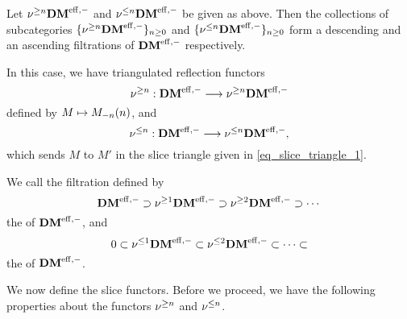 \begin{prop}\label{prop_slice_DMeff}
Let $\sgDM{n} \DMeff$ and $\slDM{n} \DMeff$ be given as above.
Then the collections of subcategories $\{\sgDM{n} \DMeff\}_{n 
\geq 0}$ and $\{\slDM{n} \DMeff\}_{n \geq 0}$ form a descending 
and an ascending filtrations of $\DMeff$ respectively.

In this case, we have triangulated reflection functors 
\[
\sgDM{n}: \DMeff \to \sgDM{n}\DMeff
\] 
defined by $M \mapsto \tZ[n]{\hZ[n]{M}}$, and 
\[
\slDM{n}: \DMeff \to \slDM{n}\DMeff,
\]
which sends $M$ to $M'$ in the slice triangle given in 
\eqref{eq_slice_triangle_1}.
\end{prop}

\begin{defn}
We call the filtration defined by
\[
\DMeff \supset \sgDM{1}\DMeff \supset \sgDM{2}\DMeff \supset \cdots \\
\]
the  of $\DMeff$, and
\[
0 \subset \slDM{1}\DMeff \subset \slDM{2}\DMeff \subset \cdots \subset
\]
the  of $\DMeff$.
\end{defn}

We now define the slice functors. Before we proceed, we have the
following properties about the functors $\sgDM{n}$ and $\slDM{n}$.

